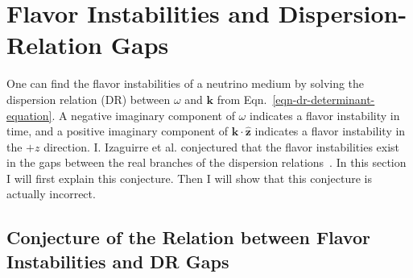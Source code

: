 





\section{\label{chap:collective-sec:fast-mode-subsec:instabilities-and-gaps}Flavor Instabilities and Dispersion-Relation Gaps}

One can find the flavor instabilities of a neutrino medium by solving the dispersion relation (DR) between $\omega$ and $\mathbf k$ from Eqn.~\eqref{eqn-dr-determinant-equation}. A negative imaginary component of $\omega$ indicates a flavor instability in time, and a positive imaginary component of $\mathbf k \cdot \hat{\mathbf z}$ indicates a flavor instability in the $+z$ direction. I. Izaguirre et al. conjectured that the flavor instabilities exist in the gaps between the real branches of the dispersion relations~\cite{Izaguirre2016a}. In this section I will first explain this conjecture. Then I will show that this conjecture is actually incorrect.


\subsection{Conjecture of the Relation between Flavor Instabilities and DR Gaps}


